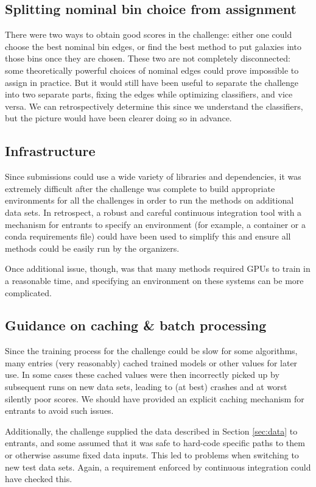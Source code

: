 \documentclass[twocolumn,twocolappendix]{aastex63}
\begin{document}
\subsection{Splitting nominal bin choice from assignment}
There were two ways to obtain good scores in the challenge: either one could choose the best
nominal bin edges, or find the best method to put galaxies into those bins once they are chosen.
These two are not completely disconnected: some theoretically powerful choices of nominal edges
could prove impossible to assign in practice.  But it would still have been useful to separate
the challenge into two separate parts, fixing the edges while optimizing classifiers, and vice
versa.   We can retrospectively determine this since we understand the classifiers, but the picture
would have been clearer doing so in advance.

\subsection{Infrastructure}
Since submissions could use a wide variety of libraries and dependencies, it was extremely
difficult after the challenge was complete to build appropriate environments for all the challenges
in order to run the methods on additional data sets. In retrospect, a robust and careful
continuous integration tool with a mechanism for entrants to specify an environment (for example, a 
container or a {\sc conda} requirements file) could have been used to simplify this and ensure
all methods could be easily run by the organizers.

Once additional issue, though, was that many methods required GPUs to train in a reasonable time,
and specifying an environment on these systems can be more complicated.

\subsection{Guidance on caching \& batch processing}
Since the training process for the challenge could be slow for some algorithms, many entries
(very reasonably) cached trained models or other values for later use.  In some cases these
cached values were then incorrectly picked up by subsequent runs on new data sets, leading
to (at best) crashes and at worst silently poor scores.  We should have provided an explicit
caching mechanism for entrants to avoid such issues.

Additionally, the challenge supplied the data described in Section \ref{sec:data} to entrants,
and some assumed that it was safe to hard-code specific paths to them or
otherwise assume fixed data inputs.  This led to problems when switching to new test data sets. 
Again, a requirement enforced by continuous integration could have checked this.
\end{document}
